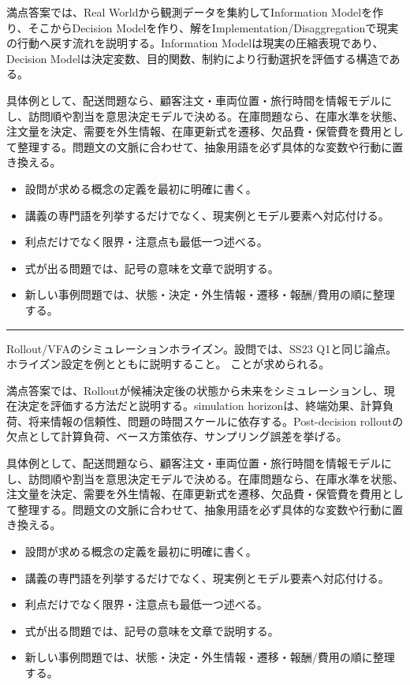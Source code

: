 満点答案では、Real Worldから観測データを集約してInformation Modelを作り、そこからDecision Modelを作り、解をImplementation/Disaggregationで現実の行動へ戻す流れを説明する。Information Modelは現実の圧縮表現であり、Decision Modelは決定変数、目的関数、制約により行動選択を評価する構造である。\par
{}
具体例として、配送問題なら、顧客注文・車両位置・旅行時間を情報モデルにし、訪問順や割当を意思決定モデルで決める。在庫問題なら、在庫水準を状態、注文量を決定、需要を外生情報、在庫更新式を遷移、欠品費・保管費を費用として整理する。問題文の文脈に合わせて、抽象用語を必ず具体的な変数や行動に置き換える。\par
{}
\begin{itemize}
\item 設問が求める概念の定義を最初に明確に書く。
\item 講義の専門語を列挙するだけでなく、現実例とモデル要素へ対応付ける。
\item 利点だけでなく限界・注意点も最低一つ述べる。
\item 式が出る問題では、記号の意味を文章で説明する。
\item 新しい事例問題では、状態・決定・外生情報・遷移・報酬/費用の順に整理する。
\end{itemize}
\vspace{2mm}\hrule\vspace{2mm}
Rollout/VFAのシミュレーションホライズン。設問では、SS23 Q1と同じ論点。ホライズン設定を例とともに説明すること。 ことが求められる。\par
{}
満点答案では、Rolloutが候補決定後の状態から未来をシミュレーションし、現在決定を評価する方法だと説明する。simulation horizonは、終端効果、計算負荷、将来情報の信頼性、問題の時間スケールに依存する。Post-decision rolloutの欠点として計算負荷、ベース方策依存、サンプリング誤差を挙げる。\par
{}
具体例として、配送問題なら、顧客注文・車両位置・旅行時間を情報モデルにし、訪問順や割当を意思決定モデルで決める。在庫問題なら、在庫水準を状態、注文量を決定、需要を外生情報、在庫更新式を遷移、欠品費・保管費を費用として整理する。問題文の文脈に合わせて、抽象用語を必ず具体的な変数や行動に置き換える。\par
{}
\begin{itemize}
\item 設問が求める概念の定義を最初に明確に書く。
\item 講義の専門語を列挙するだけでなく、現実例とモデル要素へ対応付ける。
\item 利点だけでなく限界・注意点も最低一つ述べる。
\item 式が出る問題では、記号の意味を文章で説明する。
\item 新しい事例問題では、状態・決定・外生情報・遷移・報酬/費用の順に整理する。
\end{itemize}
